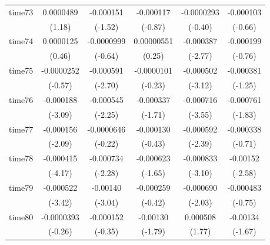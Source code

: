 \begin{table}[htbp]
\begin{tabular}{l*{5}{c}}
time73      &   0.0000489         &   -0.000151         &   -0.000117         &  -0.0000293         &   -0.000103         \\
            &      (1.18)         &     (-1.52)         &     (-0.87)         &     (-0.40)         &     (-0.66)         \\
time74      &   0.0000125         &  -0.0000999         &  0.00000551         &   -0.000387\sym{**} &   -0.000199         \\
            &      (0.46)         &     (-0.64)         &      (0.25)         &     (-2.77)         &     (-0.76)         \\
time75      &  -0.0000252         &   -0.000591\sym{**} &  -0.0000101         &   -0.000502\sym{**} &   -0.000381         \\
            &     (-0.57)         &     (-2.70)         &     (-0.23)         &     (-3.12)         &     (-1.25)         \\
time76      &   -0.000188\sym{**} &   -0.000545\sym{*}  &   -0.000337         &   -0.000716\sym{***}&   -0.000761         \\
            &     (-3.09)         &     (-2.25)         &     (-1.71)         &     (-3.55)         &     (-1.83)         \\
time77      &   -0.000156\sym{*}  &  -0.0000646         &   -0.000130         &   -0.000592\sym{*}  &   -0.000338         \\
            &     (-2.09)         &     (-0.22)         &     (-0.43)         &     (-2.39)         &     (-0.71)         \\
time78      &   -0.000415\sym{***}&   -0.000734\sym{*}  &   -0.000623         &   -0.000833\sym{**} &    -0.00152\sym{*}  \\
            &     (-4.17)         &     (-2.28)         &     (-1.65)         &     (-3.10)         &     (-2.58)         \\
time79      &   -0.000522\sym{***}&    -0.00140\sym{**} &   -0.000259         &   -0.000690\sym{*}  &   -0.000483         \\
            &     (-3.42)         &     (-3.04)         &     (-0.42)         &     (-2.03)         &     (-0.75)         \\
time80      &  -0.0000393         &   -0.000152         &    -0.00130         &    0.000508         &    -0.00134         \\
            &     (-0.26)         &     (-0.35)         &     (-1.79)         &      (1.77)         &     (-1.67)         \\

\end{tabular}
\end{table}
